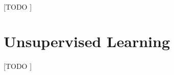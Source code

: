\documentclass{article}
\begin{document}
				\paragraph{}
				[TODO ]

	\section{Unsupervised Learning}
	\label{sec:unsupervised-learning}

			\paragraph{}
			[TODO ]


	\nocite{subject:taa}
	\nocite{pactk:py-machine-learning}

  
  
\end{document}
